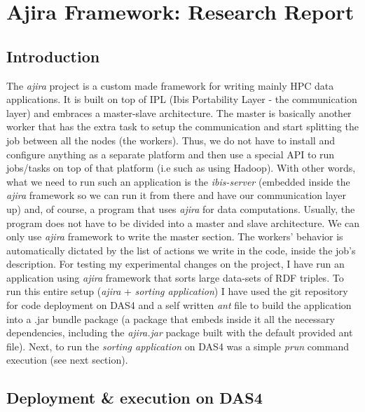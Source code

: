 \section{Ajira Framework: Research Report}

\subsection{Introduction}

The \textit{ajira} project is a custom made framework for writing mainly HPC data applications. It is built on top of IPL (Ibis Portability Layer - the communication layer) and embraces a master-slave architecture. The master is basically another worker that has the extra task to setup the communication and start splitting the job between all the nodes (the workers). Thus, we do not have to install and configure anything as a separate platform and then use a special API to run jobs/tasks on top of that platform (i.e such as using Hadoop). With other words, what we need to run such an application is the \textit{ibis-server} (embedded inside the \textit{ajira} framework so we can run it from there and have our communication layer up) and, of course, a program that uses \textit{ajira} for data computations. Usually, the program does not have to be divided into a master and slave architecture. We can only use \textit{ajira} framework to write the master section. The workers' behavior is automatically dictated by the list of actions we write in the code, inside the job's description. For testing my experimental changes on the project, I have run an application using \textit{ajira} framework that sorts large data-sets of RDF triples. To run this entire setup (\textit{ajira} + \textit{sorting application}) I have used the git repository for code deployment on DAS4 and a self written \textit{ant} file \cite{build_file} to build the application into a .jar bundle package (a package that embeds inside it all the necessary dependencies, including the \textit{ajira.jar} package built with the default provided ant file). Next, to run the \textit{sorting application} on DAS4 was a simple \textit{prun} command execution (see next section).

% 
\subsection{Deployment \& execution on DAS4}

